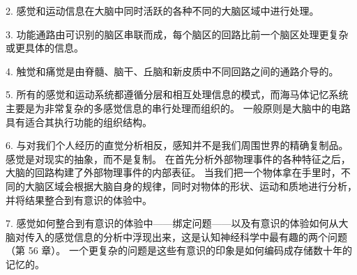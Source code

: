 2. 感觉和运动信息在大脑中同时活跃的各种不同的大脑区域中进行处理。

3. 功能通路由可识别的脑区串联而成，每个脑区的回路比前一个脑区处理更复杂或更具体的信息。

4. 触觉和痛觉是由脊髓、脑干、丘脑和新皮质中不同回路之间的通路介导的。 

5. 所有的感觉和运动系统都遵循分层和相互处理信息的模式，而海马体记忆系统主要是为非常复杂的多感觉信息的串行处理而组织的。 一般原则是大脑中的电路具有适合其执行功能的组织结构。 

6. 与对我们个人经历的直觉分析相反，感知并不是我们周围世界的精确复制品。 感觉是对现实的抽象，而不是复制。 在首先分析外部物理事件的各种特征之后，大脑的回路构建了外部物理事件的内部表征。 当我们把一个物体拿在手里时，不同的大脑区域会根据大脑自身的规律，同时对物体的形状、运动和质地进行分析，并将结果整合到有意识的体验中。 

7. 感觉如何整合到有意识的体验中——绑定问题——以及有意识的体验如何从大脑对传入的感觉信息的分析中浮现出来，这是认知神经科学中最有趣的两个问题（第 56 章）。 一个更复杂的问题是这些有意识的印象是如何编码成存储数十年的记忆的。
























